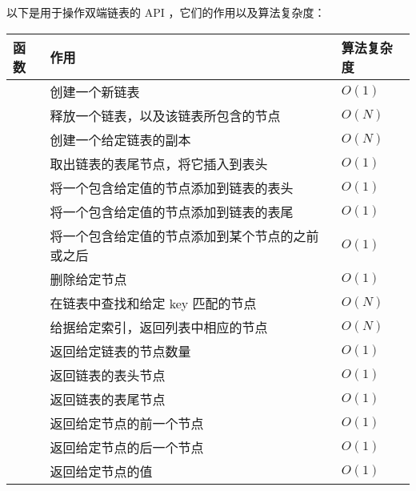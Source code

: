 \documentclass[a4paper,11pt,english]{sphinxmanual}
\begin{document}
以下是用于操作双端链表的 API ，它们的作用以及算法复杂度：

\begin{tabulary}{\linewidth}{|L|L|L|}
\hline
\textbf{
函数
} & \textbf{
作用
} & \textbf{
算法复杂度
}\\\hline

 & 
创建一个新链表
 & 
$O(1)$
\\\hline

 & 
释放一个链表，以及该链表所包含的节点
 & 
$O(N)$
\\\hline

 & 
创建一个给定链表的副本
 & 
$O(N)$
\\\hline

 & 
取出链表的表尾节点，将它插入到表头
 & 
$O(1)$
\\\hline

 & 
将一个包含给定值的节点添加到链表的表头
 & 
$O(1)$
\\\hline

 & 
将一个包含给定值的节点添加到链表的表尾
 & 
$O(1)$
\\\hline

 & 
将一个包含给定值的节点添加到某个节点的之前或之后
 & 
$O(1)$
\\\hline

 & 
删除给定节点
 & 
$O(1)$
\\\hline

 & 
在链表中查找和给定 key 匹配的节点
 & 
$O(N)$
\\\hline

 & 
给据给定索引，返回列表中相应的节点
 & 
$O(N)$
\\\hline

 & 
返回给定链表的节点数量
 & 
$O(1)$
\\\hline

 & 
返回链表的表头节点
 & 
$O(1)$
\\\hline

 & 
返回链表的表尾节点
 & 
$O(1)$
\\\hline

 & 
返回给定节点的前一个节点
 & 
$O(1)$
\\\hline

 & 
返回给定节点的后一个节点
 & 
$O(1)$
\\\hline

 & 
返回给定节点的值
 & 
$O(1)$
\\\hline
\end{tabulary}
\end{document}
